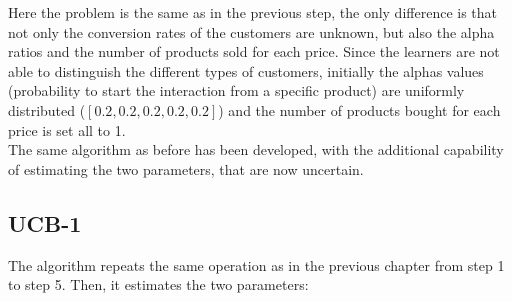 Here the problem is the same as in the previous step, the only difference is that not only the conversion rates of the customers are unknown, but also the alpha ratios and the number of products sold for each price.
Since the learners are not able to distinguish the different types of customers, initially the alphas values (probability to start the interaction from a specific product) are uniformly distributed ($[0.2, 0.2, 0.2, 0.2, 0.2]$) and the number of products bought for each price is set all to 1.\\
The same algorithm as before has been developed, with the additional capability of estimating the two parameters, that are now uncertain.

\subsection{UCB-1}
The algorithm repeats the same operation as in the previous chapter from step 1 to step 5. Then, it estimates the two parameters:

